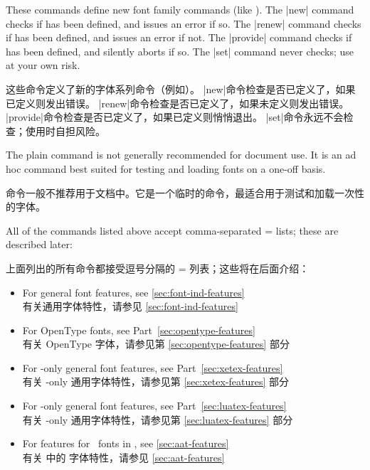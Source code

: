 \documentclass[a4paper]{l3doc}
\begin{document}
These commands define new font family commands (like ).
The |new| command checks if  has been defined, and issues an error if so.
The |renew| command checks if  has been defined, and issues an error if not.
The |provide| command checks if  has been defined, and silently aborts if so.
The |set| command never checks; use at your own risk.

这些命令定义了新的字体系列命令（例如）。
|new|命令检查是否已定义了，如果已定义则发出错误。
|renew|命令检查是否已定义了，如果未定义则发出错误。
|provide|命令检查是否已定义了，如果已定义则悄悄退出。
|set|命令永远不会检查；使用时自担风险。

\bigskip
{}

The plain  command is not generally recommended for document use. It is an
ad hoc command best suited for testing and loading fonts on a one-off basis.

 命令一般不推荐用于文档中。它是一个临时的命令，最适合用于测试和加载一次性的字体。

All of the commands listed above accept comma-separated
= lists; these are described later:

上面列出的所有命令都接受逗号分隔的 = 列表；这些将在后面介绍：
\begin{itemize}
\item For general font features, see \vref{sec:font-ind-features}\\
有关通用字体特性，请参见 \vref{sec:font-ind-features}
\item For OpenType fonts, see Part~\vref{sec:opentype-features}\\
有关 OpenType 字体，请参见第 \vref{sec:opentype-features} 部分
\item For \XeTeX-only general font features, see Part~\vref{sec:xetex-features}\\
有关 \XeTeX-only 通用字体特性，请参见第 \vref{sec:xetex-features} 部分
\item For \LuaTeX-only general font features, see Part~\vref{sec:luatex-features}\\
有关 \LuaTeX-only 通用字体特性，请参见第 \vref{sec:luatex-features} 部分
\item For features for \AAT\ fonts in \XeTeX, see \vref{sec:aat-features}\\
有关 \XeTeX 中的 \AAT 字体特性，请参见 \vref{sec:aat-features}
\end{itemize}
\end{document}
